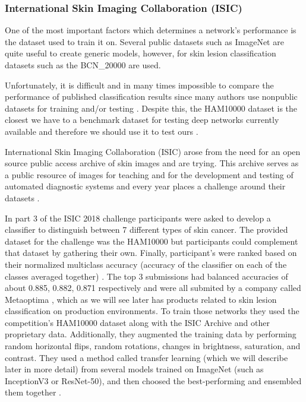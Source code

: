 \documentclass[journal,compsoc]{IEEEtran}
\begin{document}
\subsubsection{International Skin Imaging Collaboration (ISIC)}
One of the most important factors which determines a network's performance is the dataset used to train it on. Several public datasets such as ImageNet are quite useful to create generic models, however, for skin lesion classification datasets such as the BCN\_20000\cite{bcn_20000} are used. \par
Unfortunately, it is difficult and in many times impossible to compare the performance of published classification results since many authors use nonpublic datasets for training and/or testing \cite{Brinker2018}. Despite this, the HAM10000 dataset is the closest we have to a benchmark dataset for testing deep networks currently available and therefore we should use it to test ours \cite{ham10000}. \par
International Skin Imaging Collaboration (ISIC) arose from the need for an open source public access archive of skin images and are trying. This archive serves as a public resource of images for teaching and for the development and testing of automated diagnostic systems and every year places a challenge around their datasets \cite{isic2019}. \par
In part 3 of the ISIC 2018 challenge participants were asked to develop a classifier to distinguish between 7 different types of skin cancer. The provided dataset for the challenge was the HAM10000 but participants could complement that dataset by gathering their own. Finally, participant's were ranked based on their normalized multiclass accuracy (accuracy of the classifier on each of the classes averaged together) \cite{isic2018}. The top 3 submissions had balanced accuracies of about 0.885, 0.882, 0.871 respectively and were all submited by a company called Metaoptima \cite{isic2018top3}, which as we will see later has products related to skin lesion classification on production environments. To train those networks they used the competition’s HAM10000 dataset along with the ISIC Archive and other proprietary data. Additionally, they augmented the training data by performing random horizontal flips, random rotations, changes in brightness, saturation, and contrast. They used a method called transfer learning (which we will describe later in more detail) from several models trained on ImageNet (such as InceptionV3 or ResNet-50), and then choosed the best-performing and ensembled them together \cite{isic2018top3}. \par
\end{document}
